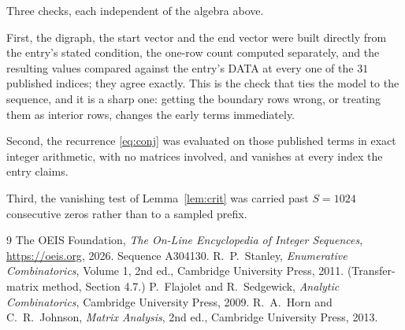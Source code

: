 \documentclass[11pt,a4paper]{article}
\theoremstyle{plain}
\theoremstyle{definition}
\begin{document}
Three checks, each independent of the algebra above.

First, the digraph, the start vector and the end vector were built directly from the
entry's stated condition, the one-row count computed separately, and the resulting values
compared against the entry's DATA at every one of the $31$ published indices; they
agree exactly. This is the check that ties the model to the sequence, and it is a sharp one:
getting the boundary rows wrong, or treating them as interior rows, changes the early terms
immediately.

Second, the recurrence \eqref{eq:conj} was evaluated on those published terms in exact
integer arithmetic, with no matrices involved, and vanishes at every index the entry claims.

Third, the vanishing test of Lemma~\ref{lem:crit} was carried past $S=1024$ consecutive
zeros rather than to a sampled prefix.

\begin{thebibliography}{9}
 The OEIS Foundation, \emph{The On-Line Encyclopedia of Integer
Sequences}, \url{https://oeis.org}, 2026. Sequence A304130.
 R.~P.~Stanley, \emph{Enumerative Combinatorics}, Volume 1, 2nd ed.,
Cambridge University Press, 2011. (Transfer-matrix method, Section 4.7.)
 P.~Flajolet and R.~Sedgewick, \emph{Analytic Combinatorics}, Cambridge
University Press, 2009.
 R.~A.~Horn and C.~R.~Johnson, \emph{Matrix Analysis}, 2nd ed., Cambridge
University Press, 2013.
\end{thebibliography}
\end{document}
